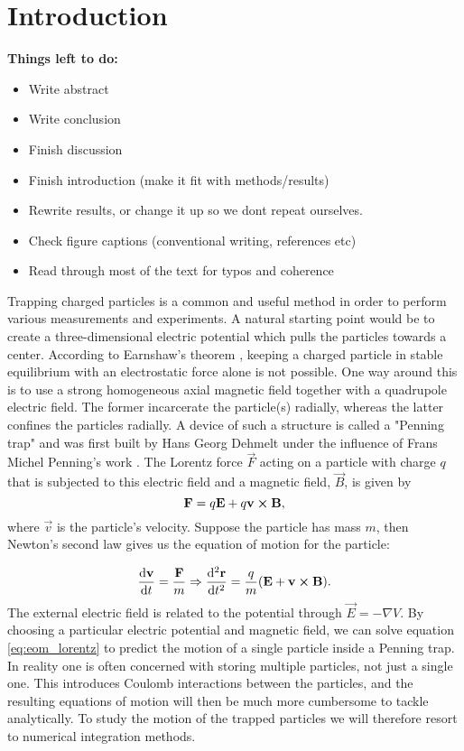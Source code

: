 \section{Introduction}\label{sec:introduction}


\textbf{Things left to do:}
\begin{itemize}
    \item Write abstract
    \item Write conclusion
    \item Finish discussion
    \item Finish introduction (make it fit with methods/results)
    \item Rewrite results, or change it up so we dont repeat ourselves. 
    \item Check figure captions (conventional writing, references etc)
    \item Read through most of the text for typos and coherence
\end{itemize}


Trapping charged particles is a common and useful method in order to perform various measurements and experiments. A natural starting point would be to create a three-dimensional electric potential which pulls the particles towards a center. According to Earnshaw's theorem \citep{GriffithsEarnshaw}, keeping a charged particle in stable equilibrium with an electrostatic force alone is not possible. One way around this is to use a strong homogeneous axial magnetic field together with a quadrupole electric field. The former incarcerate the particle(s) radially, whereas the latter confines the particles radially. A device of such a structure is called a "Penning trap" and was first built by Hans Georg Dehmelt under the influence of Frans Michel Penning's work \citep{Dehmelt1989}. The Lorentz force $\vec{F}$ acting on a particle with charge $q$ that is subjected to this electric field and a magnetic field, $\vec{B}$, is given by 
\begin{equation}\label{eq:lorentz_force}
    \mathbf{F} = q\mathbf{E} + q \mathbf{v} \cross \mathbf{B},
\end{equation}
where $\vec{v}$ is the particle's velocity. Suppose the particle has mass $m$, then Newton's second law gives us the equation of motion for the particle:

\begin{equation}\label{eq:eom_lorentz}
 \dv{\mathbf{v}}{t} = \frac{\mathbf{F}}{m}  \Rightarrow \dv[2]{\mathbf{r}}{t}= \frac{q}{m} (\mathbf{E} + \mathbf{v} \cross \mathbf{B} ).
\end{equation}
The external electric field is related to the potential through $\vec{E} = -\nabla V$. By choosing a particular electric potential and magnetic field, we can solve equation \eqref{eq:eom_lorentz} to predict the motion of a single particle inside a Penning trap. In reality one is often concerned with storing multiple particles, not just a single one. This introduces Coulomb interactions between the particles, and the resulting equations of motion will then be much more cumbersome to tackle analytically. To study the motion of the trapped particles we will therefore resort to numerical integration methods. 

